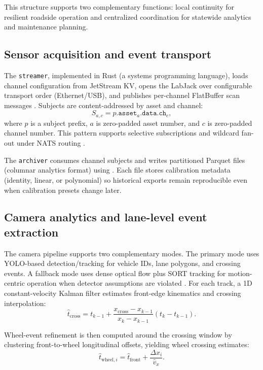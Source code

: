 \documentclass[conference]{IEEEtran}
\begin{document}
This structure supports two complementary functions: local continuity for resilient roadside operation and centralized coordination for statewide analytics and maintenance planning.

\subsection{Sensor acquisition and event transport}
The \texttt{streamer}, implemented in Rust (a systems programming language), loads channel configuration from JetStream KV, opens the LabJack over configurable transport order (Ethernet/USB), and publishes per-channel FlatBuffer scan messages \cite{google_flatbuffers}. Subjects are content-addressed by asset and channel:
\begin{equation}
S_{a,c} = p.\texttt{asset}_a.\texttt{data}.\texttt{ch}_c,
\end{equation}
where $p$ is a subject prefix, $a$ is zero-padded asset number, and $c$ is zero-padded channel number. This pattern supports selective subscriptions and wildcard fan-out under NATS routing \cite{nats_io}.

The \texttt{archiver} consumes channel subjects and writes partitioned Parquet files (columnar analytics format) using
. 
Each file stores calibration metadata (identity, linear, or polynomial) so historical exports remain reproducible even when calibration presets change later.

\subsection{Camera analytics and lane-level event extraction}
The camera pipeline supports two complementary modes. The primary mode uses YOLO-based detection/tracking for vehicle IDs, lane polygons, and crossing events. A fallback mode uses dense optical flow plus SORT tracking for motion-centric operation when detector assumptions are violated \cite{Farnebaeck2003, bewley2016}. For each track, a 1D constant-velocity Kalman filter estimates front-edge kinematics and crossing interpolation:
\begin{equation}
\hat{t}_{\mathrm{cross}} = t_{k-1} + \frac{x_{\mathrm{cross}}-x_{k-1}}{x_k-x_{k-1}}(t_k-t_{k-1}).
\end{equation}

Wheel-event refinement is then computed around the crossing window by clustering front-to-wheel longitudinal offsets, yielding wheel crossing estimates:
\begin{equation}
\hat{t}_{\mathrm{wheel},i} = \hat{t}_{\mathrm{front}} + \frac{\Delta x_i}{\hat{v}_x}.
\end{equation}
\end{document}
